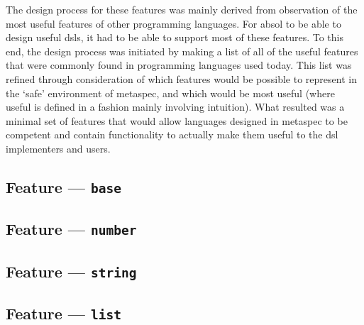 The design process for these features was mainly derived from observation of the most useful features of other programming languages.
For \gls{absol} to be able to design useful \glspl{dsl}, it had to be able to support most of these features. 
To this end, the design process was initiated by making a list of all of the useful features that were commonly found in programming languages used today.
This list was refined through consideration of which features would be possible to represent in the `safe' environment of \gls{metaspec}, and which would be most useful (where useful is defined in a fashion mainly involving intuition).
What resulted was a minimal set of features that would allow languages designed in \gls{metaspec} to be competent and contain functionality to actually make them useful to the \gls{dsl} implementers and users. 

\subsection{Feature --- \texttt{base}} %
\label{sub:feature_base}


\subsection{Feature --- \texttt{number}} %
\label{sub:feature_number}


\subsection{Feature --- \texttt{string}} %
\label{sub:feature_string}


\subsection{Feature --- \texttt{list}} %
\label{sub:feature_list}

